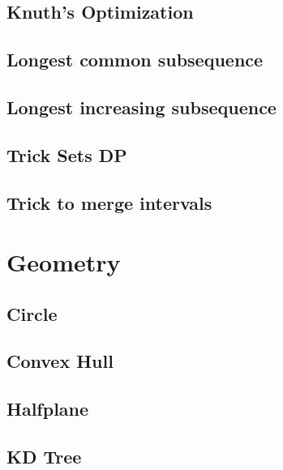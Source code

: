 \subsection{Knuth's Optimization}
\raggedbottom
\hrulefill
\subsection{Longest common subsequence}
\raggedbottom
\hrulefill
\subsection{Longest increasing subsequence}
\raggedbottom
\hrulefill
\subsection{Trick Sets DP}
\raggedbottom
\hrulefill
\subsection{Trick to merge intervals}
\raggedbottom
\hrulefill

\section{Geometry}
\subsection{Circle}
\raggedbottom
\hrulefill
\subsection{Convex Hull}
\raggedbottom
\hrulefill
\subsection{Halfplane}
\raggedbottom
\hrulefill
\subsection{KD Tree}
\raggedbottom
\hrulefill
